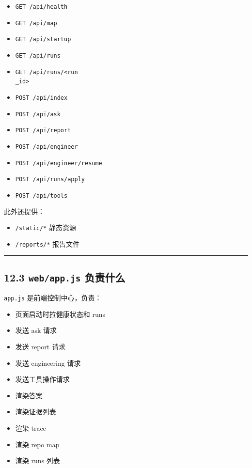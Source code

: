 \documentclass[UTF8,12pt,openany]{ctexbook}
\begin{document}
\begin{itemize}
\item \texttt{GET /api/health}
\item \texttt{GET /api/map}
\item \texttt{GET /api/startup}
\item \texttt{GET /api/runs}
\item \texttt{GET /api/runs/<run\\_id>}
\item \texttt{POST /api/index}
\item \texttt{POST /api/ask}
\item \texttt{POST /api/report}
\item \texttt{POST /api/engineer}
\item \texttt{POST /api/engineer/resume}
\item \texttt{POST /api/runs/apply}
\item \texttt{POST /api/tools}
\end{itemize}

此外还提供：\par

\begin{itemize}
\item \texttt{/static/*} 静态资源
\item \texttt{/reports/*} 报告文件
\end{itemize}

\hrule

\subsection{12.3 \texttt{web/app.js} 负责什么}

\texttt{app.js} 是前端控制中心，负责：\par

\begin{itemize}
\item 页面启动时拉健康状态和 runs
\item 发送 ask 请求
\item 发送 report 请求
\item 发送 engineering 请求
\item 发送工具操作请求
\item 渲染答案
\item 渲染证据列表
\item 渲染 trace
\item 渲染 repo map
\item 渲染 runs 列表
\end{itemize}
\end{document}
